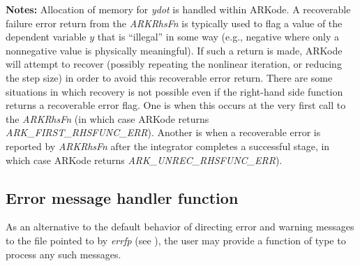 \documentclass[letterpaper,10pt,english]{sphinxmanual}
\begin{document}
\begin{fulllineitems}
\textbf{Notes:} Allocation of memory for \emph{ydot} is handled within
ARKode.  A recoverable failure error return from the \emph{ARKRhsFn} is
typically used to flag a value of the dependent variable $y$
that is ``illegal'' in some way (e.g., negative where only a
nonnegative value is physically meaningful).  If such a return is
made, ARKode will attempt to recover (possibly repeating the
nonlinear iteration, or reducing the step size) in order to avoid
this recoverable error return.  There are some situations in which
recovery is not possible even if the right-hand side function
returns a recoverable error flag.  One is when this occurs at the
very first call to the \emph{ARKRhsFn} (in which case
ARKode returns \emph{ARK\_FIRST\_RHSFUNC\_ERR}).  Another is when a
recoverable error is reported by \emph{ARKRhsFn} after the integrator
completes a successful stage, in which case ARKode returns
\emph{ARK\_UNREC\_RHSFUNC\_ERR}).

\end{fulllineitems}



\subsection{Error message handler function}
\label{c_interface/User_supplied:cinterface-errorhandler}\label{c_interface/User_supplied:error-message-handler-function}
As an alternative to the default behavior of directing error and
warning messages to the file pointed to by \emph{errfp} (see
{\hyperref[c_interface/User_callable:ARKodeSetErrFile]{}}), the user may provide a function of type
{\hyperref[c_interface/User_supplied:ARKErrHandlerFn]{}} to process any such messages.
\end{document}
